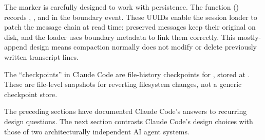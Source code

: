 The  marker is carefully designed to work with persistence. The  function () records , , and  in the boundary event. These UUIDs enable the session loader to patch the message chain at read time: preserved messages keep their original  on disk, and the loader uses boundary metadata to link them correctly. This mostly-append design means compaction normally does not modify or delete previously written transcript lines.

The ``checkpoints'' in Claude Code are file-history checkpoints for , stored at . These are file-level snapshots for reverting filesystem changes, not a generic checkpoint store.

The preceding sections have documented Claude Code's answers to recurring design questions. The next section contrasts Claude Code's design choices with those of two architecturally independent AI agent systems.



